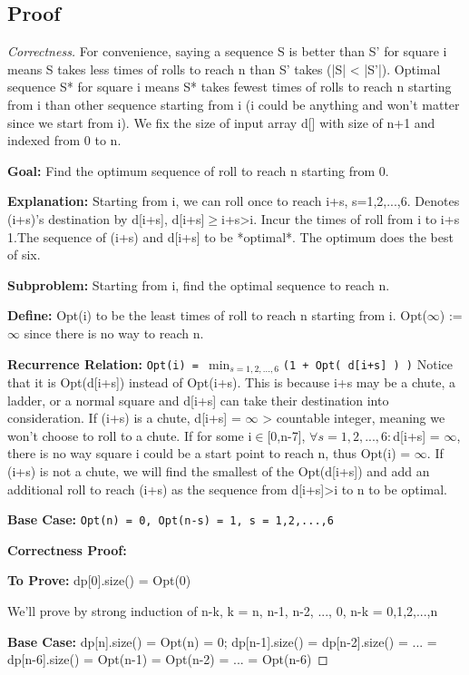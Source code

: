 \documentclass[openany]{article}
\begin{document}
\subsection*{Proof}
\begin{proof}[Correctness]{}
    For convenience, saying a sequence S is better than S' for square i means S takes less times of rolls to reach n than S' takes (|S| < |S'|). Optimal sequence S* for square i means S* takes fewest times of rolls to reach n starting from i than other sequence starting from i (i could be anything and won't matter since we start from i). We fix the size of input array d[] with size of n+1 and indexed from 0 to n.
    
\textbf{Goal:} Find the optimum sequence of roll to reach n starting from 0.

\textbf{Explanation:} Starting from i, we can roll once to reach i+s, s=1,2,...,6. Denotes (i+s)'s destination by d[i+s], d[i+s]$\geq$i+s>i. Incur the times of roll from i to i+s 1.The sequence of (i+s) and d[i+s] to be *optimal*. The optimum does the best of six.
    
\textbf{Subproblem:}
    Starting from i, find the optimal sequence to reach n.
    
\textbf{Define:} Opt(i) to be the least times of roll to reach n starting from i. Opt($\infty$) := $\infty$ since there is no way to reach n.
    
\textbf{Recurrence Relation:}
    \texttt{Opt(i) = $\min_{s=1,2,...,6}$(1 + Opt( d[i+s] ) )}
    Notice that it is Opt(d[i+s]) instead of Opt(i+s). This is because i+s may be a chute, a ladder, or a normal square and d[i+s] can take their destination into consideration. If (i+s) is a chute, d[i+s] = $\infty$ > countable integer, meaning we won't choose to roll to a chute. If for some i$\in$[0,n-7], $\forall s = 1,2,...,6: $d[i+s] = $\infty$, there is no way square i could be a start point to reach n, thus Opt(i) = $\infty$. If (i+s) is not a chute, we will find the smallest of the Opt(d[i+s]) and add an additional roll to reach (i+s) as the sequence from d[i+s]>i to n to be optimal.
    
\textbf{Base Case:}
    \texttt{Opt(n) = 0, Opt(n-s) = 1, s = 1,2,...,6}
    
\textbf{Correctness Proof:}

    \textbf{To Prove:} dp[0].size() = Opt(0)
    
    We'll prove by strong induction of n-k, k = n, n-1, n-2, ..., 0, n-k = 0,1,2,...,n
    
    \textbf{Base Case:} dp[n].size() = Opt(n) = 0; dp[n-1].size() = dp[n-2].size() = ... = dp[n-6].size() = Opt(n-1) = Opt(n-2) = ... = Opt(n-6)
    

\end{proof}
\end{document}
